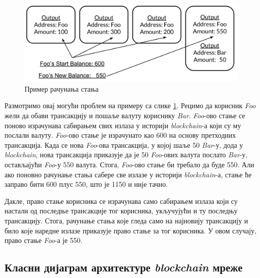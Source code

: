 \documentclass[12pt, a4paper]{article}
\begin{document}
\begin{figure}[h]
    \centering
    \includegraphics[width=1\linewidth]{slike/balance.png}
    \caption{Пример рачунања стања}
    \label{fig:balance}
\end{figure}
\pagebreak
Размотримо овај могући проблем на примеру са слике \ref{fig:balance}. Рецимо да корисник \textit{Foo} жели да обави трансакцију и пошаље валуту кориснику \textit{Bar}. \textit{Foo}-ово стање се поново израчунава сабирањем свих излаза у историји \textit{blockchain}-а који су му послали валуту. \textit{Foo}-ово стање је израчунато као 600 на основу претходних трансакција. Када се нова \textit{Foo}-ова трансакција, у којој шаље 50 \textit{Bar}-у, дода у \textit{blockchain}, нова трансакција приказује да је 50 \textit{Foo}-ових валута послато \textit{Bar}-у, остављајући \textit{Foo}-у 550 валута. Стога, \textit{Foo}-ово стање би требало да буде 550. Али ако поновно рачунање стања сабере све излазе у историји \textit{blockchain}-а, стање ће заправо бити 600 плус 550, што је 1150 и није тачно.

Дакле, право стање корисника се израчунава само сабирањем излаза који су настали од последње трансакције тог корисника, укључујући и ту последњу трансакцију. Стога, рачунање стања које гледа само на најновију трансакцију и било које наредне излазе приказује право стање за тог корисника. У овом случају, право стање \textit{Foo}-а је 550.


\newpage
\subsection{Класни дијаграм архитектуре \textit{blockchain} мреже}
\end{document}
